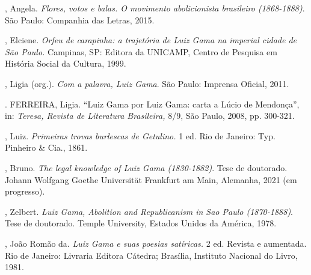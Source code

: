 \begin{bibliohedra}
, Angela. \emph{Flores, votos e balas. O movimento abolicionista
brasileiro (1868-1888)}. São Paulo: Companhia das Letras, 2015.

, Elciene. \emph{Orfeu de carapinha: a trajetória de Luiz Gama na
imperial cidade de São Paulo.} Campinas, SP: Editora da UNICAMP, Centro
de Pesquisa em História Social da Cultura, 1999.

, Ligia (org.). \emph{Com a palavra, Luiz Gama}. São Paulo:
Imprensa Oficial, 2011.

\titidem. FERREIRA, Ligia. ``Luiz Gama por Luiz Gama: carta
a Lúcio de Mendonça'', in: \emph{Teresa, Revista de Literatura
Brasileira,} 8/9, São Paulo, 2008, pp. 300-321.

, Luiz. \emph{Primeiras trovas burlescas de Getulino.} 1 ed. Rio de
Janeiro: Typ. Pinheiro \& Cia., 1861.

, Bruno. \emph{The legal knowledge of Luiz Gama (1830-1882)}. Tese
de doutorado. Johann Wolfgang Goethe Universität Frankfurt am Main,
Alemanha, 2021 (em progresso).

, Zelbert. \emph{Luiz Gama, Abolition and Republicanism in Sao
Paulo (1870-1888)}. Tese de doutorado. Temple University, Estados Unidos
da América, 1978.

, João Romão da. \emph{Luiz Gama e suas poesias satíricas.} 2 ed.
Revista e aumentada. Rio de Janeiro: Livraria Editora Cátedra; Brasília,
Instituto Nacional do Livro, 1981.
\end{bibliohedra}
